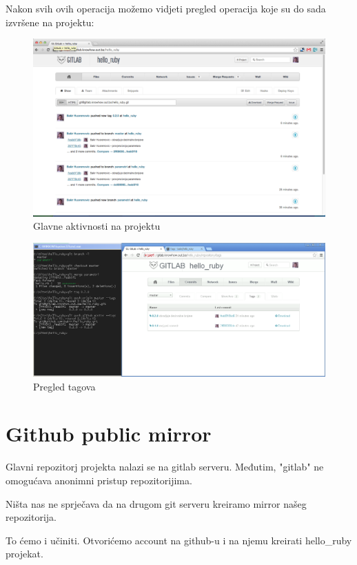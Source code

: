 \documentclass[times, utf8, seminar]{fit}
\begin{document}
Nakon svih ovih operacija možemo vidjeti pregled operacija koje su do sada izvršene na projektu:

\begin{figure}[H]
\centering
\includegraphics[width=15cm]{img/gitlab_project_show.png}
\caption{Glavne aktivnosti na projektu}
\end{figure}


\begin{figure}[H]
\centering
\includegraphics[width=15cm]{img/gitlab_tags.png}
\caption{Pregled tagova}
\end{figure}


\section{Github public mirror}

Glavni repozitorj projekta nalazi se na gitlab serveru. Međutim, "gitlab" ne omogućava anonimni pristup repozitorijima.

Ništa nas ne sprječava da na drugom git serveru kreiramo mirror našeg repozitorija.

To ćemo i učiniti. Otvorićemo account na github-u i na njemu kreirati hello\_ruby projekat.
\end{document}
